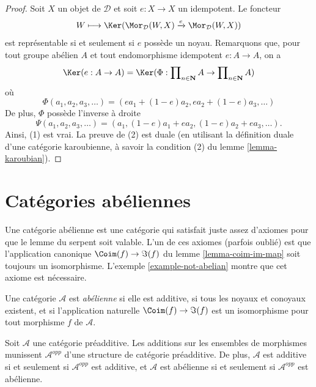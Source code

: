 \begin{proof}
Soit $X$ un objet de $\mathcal{D}$ et soit $e : X \to X$ un idempotent.
Le foncteur
$$
W \longmapsto \Ker(
\Mor_\mathcal{D}(W, X)
\xrightarrow{e}
\Mor_\mathcal{D}(W, X)
)
$$
est représentable si et seulement si $e$ possède un noyau. Remarquons que, pour tout
groupe abélien $A$ et tout endomorphisme idempotent $e : A \to A$, on a
$$
\Ker(e : A \to A)
= \Ker(\Phi :
\prod\nolimits_{n \in \mathbf{N}} A
\to
\prod\nolimits_{n \in \mathbf{N}} A
)
$$
où
$$
\Phi(a_1, a_2, a_3, \ldots) = (ea_1 + (1 - e)a_2, ea_2 + (1 - e)a_3, \ldots)
$$
De plus, $\Phi$ possède l'inverse à droite
$$
\Psi(a_1, a_2, a_3, \ldots) =
(a_1, (1 - e)a_1 + ea_2, (1 - e)a_2 + ea_3, \ldots).
$$
Ainsi, (1) est vrai. La preuve de (2) est duale (en utilisant la définition duale
d'une catégorie karoubienne, à savoir la condition (2) du
lemme \ref{lemma-karoubian}).
\end{proof}








\section{Catégories abéliennes}
\label{section-abelian-categories}

\noindent
Une catégorie abélienne est une catégorie qui satisfait juste assez d'axiomes pour que le
lemme du serpent soit valable. L'un de ces axiomes (parfois oublié)
est que l'application canonique $\Coim(f) \to \Im(f)$
du lemme \ref{lemma-coim-im-map} soit toujours un isomorphisme.
L'exemple \ref{example-not-abelian} montre que cet axiome est nécessaire.

\begin{definition}
\label{definition-abelian-category}
Une catégorie $\mathcal{A}$ est {\it abélienne} si
elle est additive, si tous les noyaux et conoyaux existent,
et si l'application naturelle $\Coim(f) \to \Im(f)$
est un isomorphisme pour tout morphisme $f$ de
$\mathcal{A}$.
\end{definition}

\begin{lemma}
\label{lemma-abelian-opposite}
Soit $\mathcal{A}$ une catégorie préadditive.
Les additions sur les ensembles de morphismes munissent
$\mathcal{A}^{opp}$ d'une structure de catégorie préadditive.
De plus, $\mathcal{A}$ est additive si et seulement si $\mathcal{A}^{opp}$
est additive, et
$\mathcal{A}$ est abélienne si et seulement si $\mathcal{A}^{opp}$ est abélienne.
\end{lemma}

